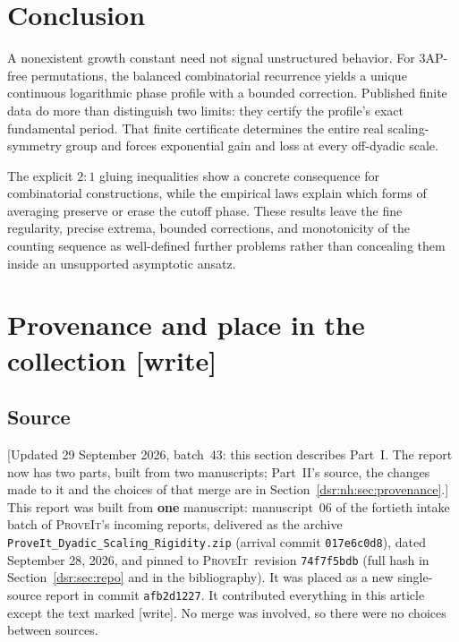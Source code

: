 \documentclass[11pt,a4paper]{article}
\numberwithin{equation}{section}
\theoremstyle{definition}
\theoremstyle{remark}
\newcommand{\repo}{\textsc{ProveIt}}
\newcommand{\wtag}{\textup{[write]}}
\newcommand{\lean}[1]{\nolinkurl{#1}}
\theoremstyle{definition}
\theoremstyle{plain}
\begin{document}
\section{Conclusion}
A nonexistent growth constant need not signal unstructured behavior. For
3AP-free permutations, the balanced combinatorial recurrence yields a unique
continuous logarithmic phase profile with a bounded correction. Published
finite data do more than distinguish two limits: they certify the profile's
exact fundamental period. That finite certificate determines the entire
real scaling-symmetry group and forces exponential gain and loss at every
off-dyadic scale.

The explicit $2{:}1$ gluing inequalities show a concrete consequence for
combinatorial constructions, while the empirical laws explain which forms of
averaging preserve or erase the cutoff phase. These results leave the fine
regularity, precise extrema, bounded corrections, and monotonicity of the
counting sequence as well-defined further problems rather than concealing
them inside an unsupported asymptotic ansatz.

\section{Provenance and place in the collection \wtag}
\label{dsr:sec:provenance}
\subsection{Source}
[Updated 29 September 2026, batch~43: this section describes Part~I. The
report now has two parts, built from two manuscripts; Part~II's source,
the changes made to it and the choices of that merge are in
Section~\ref{dsr:nh:sec:provenance}.]
This report was built from \textbf{one} manuscript: manuscript~06 of the
fortieth intake batch of \repo's incoming reports, delivered as the archive
\lean{ProveIt_Dyadic_Scaling_Rigidity.zip} (arrival commit
\lean{017e6c0d8}), dated September 28, 2026, and pinned to \repo\ revision
\lean{74f7f5bdb} (full hash in Section~\ref{dsr:sec:repo} and in the
bibliography). It was placed as a new single-source report in commit
\lean{afb2d1227}. It contributed everything in this article except the text
marked \wtag. No merge was involved, so there were no choices between
sources.
\end{document}
